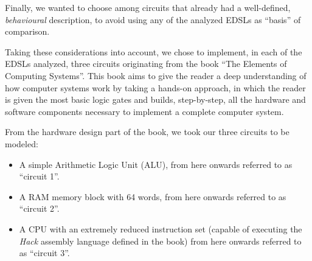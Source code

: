 \documentclass[a4paper]{article}
\begin{document}
        Finally, we wanted to choose among circuits that already had a well-defined,
        \emph{behavioural} description, to avoid using any of the analyzed EDSLs as ``basis'' of
        comparison.

        Taking these considerations into account, we chose to implement, in each of the EDSLs
        analyzed, three circuits originating from the book ``The Elements of Computing
        Systems''\cite{nand2tetris-book}. This book aims to give the reader a deep understanding of
        how computer systems work by taking a hands-on approach, in which the reader is given the
        most basic logic gates and builds, step-by-step, all the hardware and software components
        necessary to implement a complete computer system.

        \newpage

        From the hardware design part of the book, we took our three circuits to be modeled:
        \begin{itemize}
            \item A simple Arithmetic Logic Unit (ALU), from here onwards referred to
                as ``circuit 1''.
            \item A RAM memory block with 64 words, from here onwards referred to as ``circuit 2''.
            \item A CPU with an extremely reduced instruction set (capable of executing the
                \emph{Hack} assembly language defined in the book) from here onwards referred to as
                ``circuit 3''.
        \end{itemize}
\end{document}
